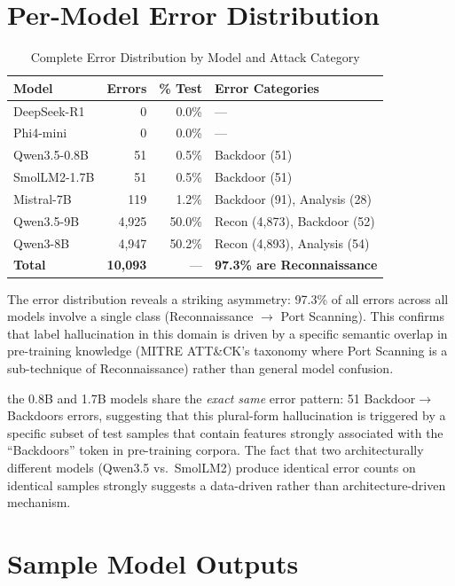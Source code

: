 \documentclass[journal]{IEEEtran}
\begin{document}
\section{Per-Model Error Distribution}
\label{app:errors}

\begin{table}[!ht]
\centering
\caption{Complete Error Distribution by Model and Attack Category}
\label{tab:allerrors}
\begin{tabular}{lrrl}
\toprule
\textbf{Model} & \textbf{Errors} & \textbf{\% Test} & \textbf{Error Categories} \\
\midrule
DeepSeek-R1 & 0 & 0.0\% & --- \\
Phi4-mini & 0 & 0.0\% & --- \\
Qwen3.5-0.8B & 51 & 0.5\% & Backdoor (51) \\
SmolLM2-1.7B & 51 & 0.5\% & Backdoor (51) \\
Mistral-7B & 119 & 1.2\% & Backdoor (91), Analysis (28) \\
Qwen3.5-9B & 4,925 & 50.0\% & Recon (4,873), Backdoor (52) \\
Qwen3-8B & 4,947 & 50.2\% & Recon (4,893), Analysis (54) \\
\midrule
\textbf{Total} & \textbf{10,093} & --- & \textbf{97.3\% are Reconnaissance} \\
\bottomrule
\end{tabular}
\end{table}

The error distribution reveals a striking asymmetry: 97.3\% of all errors across all models involve a single class (Reconnaissance $\to$ Port Scanning). This confirms that label hallucination in this domain is driven by a specific semantic overlap in pre-training knowledge (MITRE ATT\&CK's taxonomy where Port Scanning is a sub-technique of Reconnaissance) rather than general model confusion.

the 0.8B and 1.7B models share the \emph{exact same} error pattern: 51 Backdoor$\to$Backdoors errors, suggesting that this plural-form hallucination is triggered by a specific subset of test samples that contain features strongly associated with the ``Backdoors'' token in pre-training corpora. The fact that two architecturally different models (Qwen3.5 vs.\ SmolLM2) produce identical error counts on identical samples strongly suggests a data-driven rather than architecture-driven mechanism.

\section{Sample Model Outputs}
\label{app:outputs}
\end{document}
